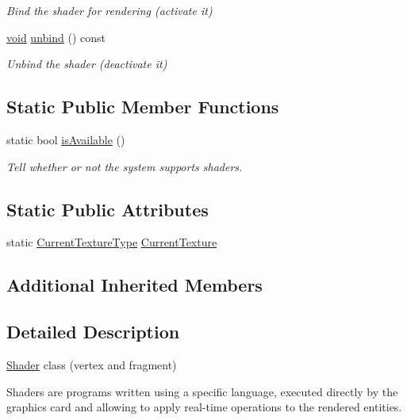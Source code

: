 \begin{DoxyCompactItemize}
\begin{DoxyCompactList}\small\item\em Bind the shader for rendering (activate it) \end{DoxyCompactList}\item 
\hyperlink{glutf90_8h_ac778d6f63f1aaf8ebda0ce6ac821b56e}{void} \hyperlink{classsf_1_1_shader_a86f6ce37c2ad74250c9ee9fdd18452a5}{unbind} () const 
\begin{DoxyCompactList}\small\item\em Unbind the shader (deactivate it) \end{DoxyCompactList}\end{DoxyCompactItemize}
\subsection*{Static Public Member Functions}
\begin{DoxyCompactItemize}
\item 
static bool \hyperlink{classsf_1_1_shader_ad22474690bafe4a305c1b9826b1bd86a}{is\-Available} ()
\begin{DoxyCompactList}\small\item\em Tell whether or not the system supports shaders. \end{DoxyCompactList}\end{DoxyCompactItemize}
\subsection*{Static Public Attributes}
\begin{DoxyCompactItemize}
\item 
static \hyperlink{structsf_1_1_shader_1_1_current_texture_type}{Current\-Texture\-Type} \hyperlink{classsf_1_1_shader_ac84c7953eec2e19358ea6e2cc5385b8d}{Current\-Texture}
\end{DoxyCompactItemize}
\subsection*{Additional Inherited Members}


\subsection{Detailed Description}
\hyperlink{classsf_1_1_shader}{Shader} class (vertex and fragment) 

Shaders are programs written using a specific language, executed directly by the graphics card and allowing to apply real-\/time operations to the rendered entities.

